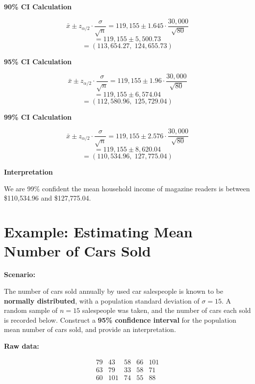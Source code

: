 \textbf{90\% CI Calculation}

\[
\bar{x} \pm z_{\alpha/2} \cdot \frac{\sigma}{\sqrt{n}} = 119{,}155 \pm 1.645 \cdot \frac{30{,}000}{\sqrt{80}}
\]
\[
= 119{,}155 \pm 5{,}500.73
\]
\[
= (113{,}654.27, \; 124{,}655.73)
\]

\textbf{95\% CI Calculation}

\[
\bar{x} \pm z_{\alpha/2} \cdot \frac{\sigma}{\sqrt{n}} = 119{,}155 \pm 1.96 \cdot \frac{30{,}000}{\sqrt{80}}
\]
\[
= 119{,}155 \pm 6{,}574.04
\]
\[
= (112{,}580.96, \; 125{,}729.04)
\]


\textbf{99\% CI Calculation}

\[
\bar{x} \pm z_{\alpha/2} \cdot \frac{\sigma}{\sqrt{n}} = 119{,}155 \pm 2.576 \cdot \frac{30{,}000}{\sqrt{80}}
\]
\[
= 119{,}155 \pm 8{,}620.04
\]
\[
= (110{,}534.96, \; 127{,}775.04)
\]


\textbf{Interpretation}


We are 99\% confident the mean household income of magazine readers is between \$110{,}534.96 and \$127{,}775.04.

\section*{Example: Estimating Mean Number of Cars Sold}

\vspace{1em}

\noindent\textbf{Scenario:}

\vspace{0.5em}

The number of cars sold annually by used car salespeople is known to be \textbf{normally distributed}, with a population standard deviation of $\sigma = 15$. A random sample of $n = 15$ salespeople was taken, and the number of cars each sold is recorded below. Construct a \textbf{95\% confidence interval} for the population mean number of cars sold, and provide an interpretation.

\vspace{1em}

\noindent\textbf{Raw data:}

\[
\begin{matrix}
79 & 43 & 58 & 66 & 101 \\
63 & 79 & 33 & 58 & 71 \\
60 & 101 & 74 & 55 & 88 \\
\end{matrix}
\]

\vspace{0.5em}

